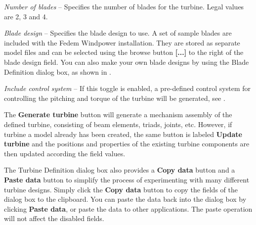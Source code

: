 \begin{bulletlist}
\item{\sl Number of blades} --
  Specifies the number of blades for the turbine. Legal values are 2, 3 and 4.

\item{\sl Blade design} --
  Specifies the blade design to use. A set of sample blades are included with
  the Fedem Windpower installation. They are stored as separate model files and
  can be selected using the browse button \textbf{[...]}
  to the right of the blade design field.
  You can also make your own blade designs by using the Blade Definition
  dialog box, as shown in .


\item{\sl Include control system} --
  If this toggle is enabled, a pre-defined control system for controlling
  the pitching and torque of the turbine will be generated,
  see .
\end{bulletlist}

The \textbf{Generate turbine} button will generate a mechanism assembly of
the defined turbine, consisting of beam elements, triads, joints, etc.
However, if turbine a model already has been created, the same button is
labeled \textbf{Update turbine} and the positions and properties of the
existing turbine components are then updated according the field values.


The Turbine Definition dialog box also provides a \textbf{Copy data} button
and a \textbf{Paste data} button to simplify the process of experimenting with
many different turbine designs. Simply click the \textbf{Copy data} button to
copy the fields of the dialog box to the clipboard.
You can paste the data back into the dialog box by clicking \textbf{Paste data},
or paste the data to other applications.
The paste operation will not affect the disabled fields.


